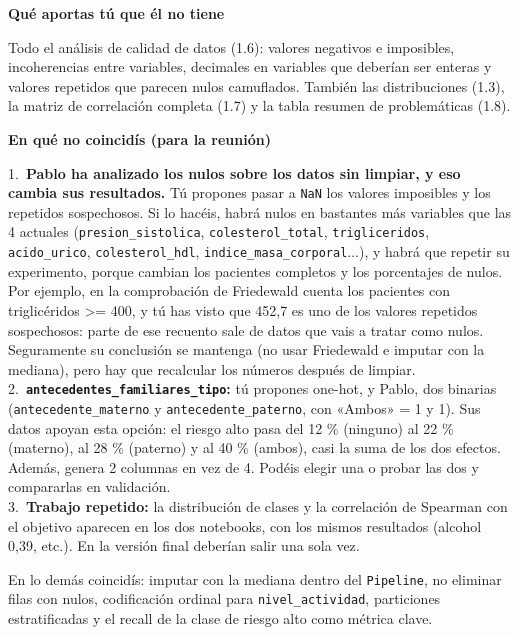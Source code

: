 \documentclass[11pt,a4paper]{article}
\begin{document}
{\textbf{Qué aportas tú que él no tiene}

Todo el análisis de calidad de datos (1.6): valores negativos e imposibles, incoherencias entre variables, decimales en variables que deberían ser enteras y valores repetidos que parecen nulos camuflados. También las distribuciones (1.3), la matriz de correlación completa (1.7) y la tabla resumen de problemáticas (1.8).

\textbf{En qué no coincidís (para la reunión)}

\hspace*{1.0em}1.~\textbf{Pablo ha analizado los nulos sobre los datos sin limpiar, y eso cambia sus resultados.} Tú propones pasar a \texttt{NaN} los valores imposibles y los repetidos sospechosos. Si lo hacéis, habrá nulos en bastantes más variables que las 4 actuales (\texttt{presion\_\allowbreak{}sistolica}, \texttt{colesterol\_\allowbreak{}total}, \texttt{trigliceridos}, \texttt{acido\_\allowbreak{}urico}, \texttt{colesterol\_\allowbreak{}hdl}, \texttt{indice\_\allowbreak{}masa\_\allowbreak{}corporal}...), y habrá que repetir su experimento, porque cambian los pacientes completos y los porcentajes de nulos. Por ejemplo, en la comprobación de Friedewald cuenta los pacientes con triglicéridos \textgreater{}= 400, y tú has visto que 452,7 es uno de los valores repetidos sospechosos: parte de ese recuento sale de datos que vais a tratar como nulos. Seguramente su conclusión se mantenga (no usar Friedewald e imputar con la mediana), pero hay que recalcular los números después de limpiar. \\{}
\hspace*{1.0em}2.~\textbf{\texttt{antecedentes\_\allowbreak{}familiares\_\allowbreak{}tipo}:} tú propones one-hot, y Pablo, dos binarias (\texttt{antecedente\_\allowbreak{}materno} y \texttt{antecedente\_\allowbreak{}paterno}, con «Ambos» = 1 y 1). Sus datos apoyan esta opción: el riesgo alto pasa del 12 \% (ninguno) al 22 \% (materno), al 28 \% (paterno) y al 40 \% (ambos), casi la suma de los dos efectos. Además, genera 2 columnas en vez de 4. Podéis elegir una o probar las dos y compararlas en validación. \\{}
\hspace*{1.0em}3.~\textbf{Trabajo repetido:} la distribución de clases y la correlación de Spearman con el objetivo aparecen en los dos notebooks, con los mismos resultados (alcohol 0,39, etc.). En la versión final deberían salir una sola vez.

En lo demás coincidís: imputar con la mediana dentro del \texttt{Pipeline}, no eliminar filas con nulos, codificación ordinal para \texttt{nivel\_\allowbreak{}actividad}, particiones estratificadas y el recall de la clase de riesgo alto como métrica clave.

}
\end{document}

